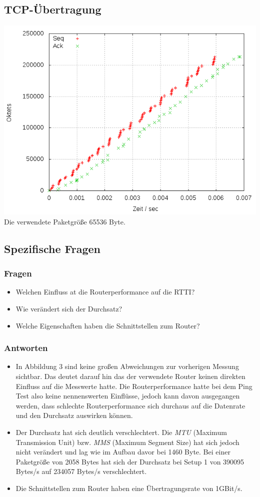\documentclass[a4paper,10pt]{article}
\begin{document}
\subsection{TCP-Übertragung}
\includegraphics[scale=0.75]{setup2.png}
Die verwendete Paketgröße 65536 Byte.

\subsection{Spezifische Fragen}
\subsubsection{Fragen}
\begin{itemize}
 \item Welchen Einfluss at die Routerperformance auf die RTTI?
 \item Wie verändert sich der Durchsatz?
 \item Welche Eigenschaften haben die Schnittstellen zum Router?
\end{itemize}
\subsubsection{Antworten}
\begin{itemize}
 \item In Abbildung 3 sind keine großen Abweichungen zur vorherigen Messung sichtbar. Das deutet darauf hin
 das der verwendete Router keinen direkten Einfluss auf die Messwerte hatte. Die Routerperformance hatte bei dem
 Ping Test also keine nennenswerten Einflüsse, jedoch kann davon ausgegangen werden, dass schlechte Routerperformance
 sich durchaus auf die Datenrate und den Durchsatz auswirken können.
 \item Der Durchsatz hat sich deutlich verschlechtert. Die \textit{MTU} (Maximum Transmission Unit) bzw. \textit{MMS}
 (Maximum Segment Size) hat sich jedoch nicht verändert und lag wie im Aufbau davor bei 1460 Byte. Bei einer Paketgröße
 von 2058 Bytes hat sich der Durchsatz bei Setup 1 von 390095 Bytes/s auf 234057 Bytes/s verschlechtert.
 \item Die Schnittstellen zum Router haben eine Übertragungsrate von 1GBit/s.
\end{itemize}
\end{document}

